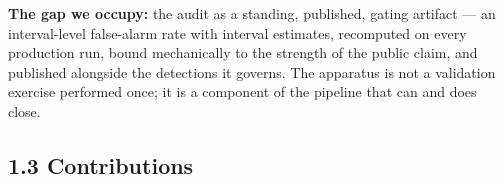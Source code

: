 \documentclass[11pt]{article}
\begin{document}
\textbf{The gap we occupy:} the audit as a standing, published, gating artifact --- an interval-level false-alarm rate with interval estimates, recomputed on every production run, bound mechanically to the strength of the public claim, and published alongside the detections it governs. The apparatus is not a validation exercise performed once; it is a component of the pipeline that can and does close.


\subsection*{1.3 Contributions}
\end{document}
